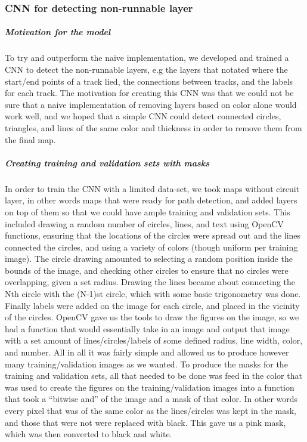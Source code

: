\documentclass[a4paper,12pt]{extarticle}
\begin{document}
\subsubsection{CNN for detecting non-runnable layer}
\subparagraph{Motivation for the model\\}

To try and outperform the naive implementation, we developed and trained a CNN to detect the non-runnable layers, e.g the layers that notated where the start/end points of a track lied, the connections between tracks, and the labels for each track.
The motivation for creating this CNN was that we could not be sure that a naive implementation of removing layers based on color alone would work well, and we hoped that a simple CNN could detect connected circles, triangles, and lines of the same color and thickness in order to remove them from the final map. 

\subparagraph{Creating training and validation sets with masks\\}

In order to train the CNN with a limited data-set, we took maps without circuit layer, in other words maps that were ready for path detection, and added layers on top of them so that we could have ample training and validation sets. This included drawing a random number of circles, lines, and text using OpenCV functions, ensuring that the locations of the circles were spread out and the lines connected the circles, and using a variety of colors (though uniform per training image). The circle drawing amounted to selecting a random position inside the bounds of the image, and checking other circles to ensure that no circles were overlapping, given a set radius. Drawing the lines became about connecting the Nth circle with the (N-1)st circle, which with some basic trigonometry was done. Finally labels were added on the image for each circle, and placed in the vicinity of the circles. OpenCV gave us the tools to draw the figures on the image, so we had a function that would essentially take in an image and output that image with a set amount of lines/circles/labels of some defined radius, line width, color, and number. All in all it was fairly simple and allowed us to produce however many training/validation images as we wanted. To produce the masks for the training and validation sets, all that needed to be done was feed in the color that was used to create the figures on the training/validation images into a function that took a “bitwise and” of the image and a mask of that color. In other words every pixel that was of the same color as the lines/circles was kept in the mask, and those that were not were replaced with black. This gave us a pink mask, which was then converted to black and white.
\end{document}
